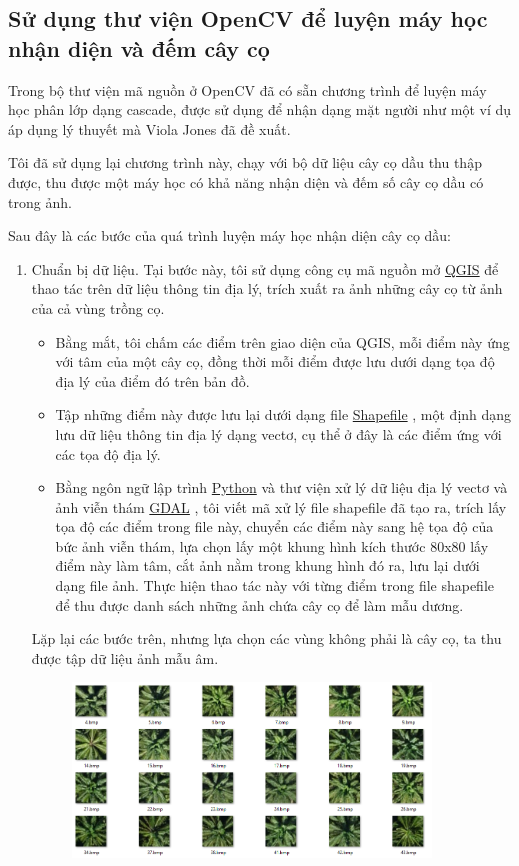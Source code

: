 \documentclass[14pt, oneside, a4paper, openany]{scrartcl}
\begin{document}
\subsection{Sử dụng thư viện OpenCV để luyện máy học nhận diện và đếm cây cọ}
Trong bộ thư viện mã nguồn ở OpenCV đã có sẵn chương trình để luyện máy học phân lớp dạng cascade, được sử dụng để nhận dạng mặt người như một ví dụ áp dụng lý thuyết mà Viola Jones đã đề xuất.

Tôi đã sử dụng lại chương trình này, chạy với bộ dữ liệu cây cọ dầu thu thập được, thu được một máy học có khả năng nhận diện và đếm số cây cọ dầu có trong ảnh.

Sau đây là các bước của quá trình luyện máy học nhận diện cây cọ dầu:
\begin{enumerate}
	\item Chuẩn bị dữ liệu. Tại bước này, tôi sử dụng công cụ mã nguồn mở \href{http://www.qgis.org/en/site/}{QGIS} \cite{qgis} để thao tác trên dữ liệu thông tin địa lý, trích xuất ra ảnh những cây cọ từ ảnh của cả vùng trồng cọ.
	\begin{itemize}
		\item Bằng mắt, tôi chấm các điểm trên giao diện của QGIS, mỗi điểm này ứng với tâm của một cây cọ, đồng thời mỗi điểm được lưu dưới dạng tọa độ địa lý của điểm đó trên bản đồ.
		\item Tập những điểm này được lưu lại dưới dạng file \href{http://doc.arcgis.com/en/arcgis-online/reference/shapefiles.htm}{Shapefile} \cite{Shapefiles}, một định dạng lưu dữ liệu thông tin địa lý dạng vectơ, cụ thể ở đây là các điểm ứng với các tọa độ địa lý.
		\item Bằng ngôn ngữ lập trình \href{https://www.python.org/}{Python} \cite{python} và thư viện xử lý dữ liệu địa lý vectơ và ảnh viễn thám \href{http://gdal.org/}{GDAL} \cite{gdal}, tôi viết mã xử lý file shapefile đã tạo ra, trích lấy tọa độ các điểm trong file này, chuyển các điểm này sang hệ tọa độ của bức ảnh viễn thám, lựa chọn lấy một khung hình kích thước 80x80 lấy điểm này làm tâm, cắt ảnh nằm trong khung hình đó ra, lưu lại dưới dạng file ảnh. Thực hiện thao tác này với từng điểm trong file shapefile để thu được danh sách những ảnh chứa cây cọ để làm mẫu dương.
	\end{itemize}
	Lặp lại các bước trên, nhưng lựa chọn các vùng không phải là cây cọ, ta thu được tập dữ liệu ảnh mẫu âm.
	\begin{figure}[!h]
		\centering
		\begin{minipage}{0.5\textwidth}
			\centering
			\includegraphics[width=0.9\textwidth]{figures/positiveList.png} %

\end{minipage}
\end{figure}
\end{enumerate}
\end{document}
